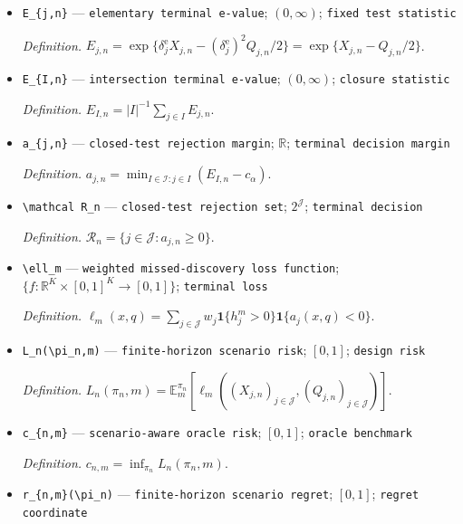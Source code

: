 \documentclass{article}
\begin{document}
\begin{itemize}
  \item \texttt{E\_\allowbreak{}\{j,\allowbreak{}n\}\allowbreak{}} --- \texttt{elementary terminal e-\allowbreak{}value}; \((0,\infty)\); \texttt{fixed test statistic}
  \par\smallskip\noindent\emph{Definition.} \(E_{j,n}=\exp\{\delta_j^{\mathrm e}X_{j,n}-(\delta_j^{\mathrm e})^2Q_{j,n}/2\}=\exp\{X_{j,n}-Q_{j,n}/2\}\).
  \item \texttt{E\_\allowbreak{}\{I,\allowbreak{}n\}\allowbreak{}} --- \texttt{intersection terminal e-\allowbreak{}value}; \((0,\infty)\); \texttt{closure statistic}
  \par\smallskip\noindent\emph{Definition.} \(E_{I,n}=|I|^{-1}\sum_{j\in I}E_{j,n}\).
  \item \texttt{a\_\allowbreak{}\{j,\allowbreak{}n\}\allowbreak{}} --- \texttt{closed-\allowbreak{}test rejection margin}; \(\mathbb R\); \texttt{terminal decision margin}
  \par\smallskip\noindent\emph{Definition.} \(a_{j,n}=\min_{I\in\mathcal I:j\in I}(E_{I,n}-c_\alpha)\).
  \item \texttt{\textbackslash{}\allowbreak{}mathcal R\_\allowbreak{}n} --- \texttt{closed-\allowbreak{}test rejection set}; \(2^{\mathcal J}\); \texttt{terminal decision}
  \par\smallskip\noindent\emph{Definition.} \(\mathcal R_n=\{j\in\mathcal J:a_{j,n}\geq0\}\).
  \item \texttt{\textbackslash{}\allowbreak{}ell\_\allowbreak{}m} --- \texttt{weighted missed-\allowbreak{}discovery loss function}; \(\{f:\mathbb R^K\times[0,1]^K\to[0,1]\}\); \texttt{terminal loss}
  \par\smallskip\noindent\emph{Definition.} \(\ell_m(x,q)=\sum_{j\in\mathcal J}w_j\mathbf 1\{h_j^m>0\}\mathbf 1\{a_j(x,q)<0\}\).
  \item \texttt{L\_\allowbreak{}n(\textbackslash{}\allowbreak{}pi\_\allowbreak{}n,\allowbreak{}m)} --- \texttt{finite-\allowbreak{}horizon scenario risk}; \([0,1]\); \texttt{design risk}
  \par\smallskip\noindent\emph{Definition.} \(L_n(\pi_n,m)=\mathbb E_m^{\pi_n}[\ell_m((X_{j,n})_{j\in\mathcal J},(Q_{j,n})_{j\in\mathcal J})]\).
  \item \texttt{c\_\allowbreak{}\{n,\allowbreak{}m\}\allowbreak{}} --- \texttt{scenario-\allowbreak{}aware oracle risk}; \([0,1]\); \texttt{oracle benchmark}
  \par\smallskip\noindent\emph{Definition.} \(c_{n,m}=\inf_{\pi_n}L_n(\pi_n,m)\).
  \item \texttt{r\_\allowbreak{}\{n,\allowbreak{}m\}\allowbreak{}(\textbackslash{}\allowbreak{}pi\_\allowbreak{}n)} --- \texttt{finite-\allowbreak{}horizon scenario regret}; \([0,1]\); \texttt{regret coordinate}

\end{itemize}
\end{document}
